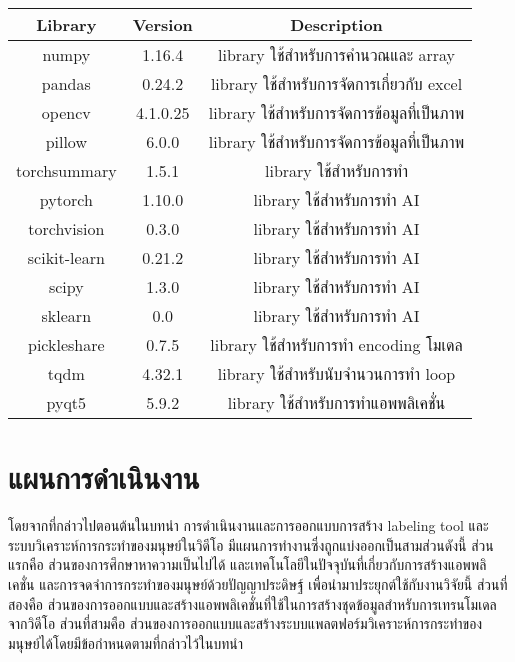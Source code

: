 \begin{tabular}{|c|c|c|}
		\hline
		{Library}&{Version}&{Description}\\
		\hline
		numpy	 			&  1.16.4		& library ใช้สำหรับการคำนวณและ array					\\
		pandas				& 0.24.2		& library ใช้สำหรับการจัดการเกี่ยวกับ excel				\\
		opencv			 	& 4.1.0.25		& library ใช้สำหรับการจัดการข้อมูลที่เป็นภาพ				\\
		pillow				& 6.0.0		& library ใช้สำหรับการจัดการข้อมูลที่เป็นภาพ				\\
		torchsummary			& 1.5.1		& library ใช้สำหรับการทำ 							\\
		pytorch		 		& 1.10.0		& library ใช้สำหรับการทำ AI							\\
		torchvision				& 0.3.0	 	& library ใช้สำหรับการทำ AI							\\
		scikit-learn				& 0.21.2		& library ใช้สำหรับการทำ AI							\\
		scipy					& 1.3.0		& library ใช้สำหรับการทำ AI							\\
		sklearn				& 0.0			& library ใช้สำหรับการทำ AI							\\
		pickleshare			& 0.7.5		& library ใช้สำหรับการทำ encoding โมเดล				\\
		tqdm					& 4.32.1		& library ใช้สำหรับนับจำนวนการทำ loop					\\
		pyqt5					& 5.9.2		& library ใช้สำหรับการทำแอพพลิเคชั่น					\\
		\hline
\end{tabular}



\vspace{3mm}
\section{แผนการดำเนินงาน}
โดยจากที่กล่าวไปตอนต้นในบทนำ
การดำเนินงานและการออกแบบการสร้าง labeling tool และระบบวิเคราะห์การกระทำของมนุษย์ในวิดีโอ มีแผนการทำงานซึ่งถูกแบ่งออกเป็นสามส่วนดังนี้ 
ส่วนแรกคือ ส่วนของการศึกษาหาความเป็นไปได้ และเทคโนโลยีในปัจจุบันที่เกี่ยวกับการสร้างแอพพลิเคชั่น และการจดจำการกระทำของมนุษย์ด้วยปัญญาประดิษฐ์ เพื่อนำมาประยุกต์ใช้กับงานวิจัยนี้
ส่วนที่สองคือ ส่วนของการออกแบบและสร้างแอพพลิเคชั่นที่ใช้ในการสร้างชุดข้อมูลสำหรับการเทรนโมเดลจากวิดีโอ
ส่วนที่สามคือ ส่วนของการออกแบบและสร้างระบบแพลตฟอร์มวิเคราะห์การกระทำของมนุษย์ได้โดยมีข้อกำหนดตามที่กล่าวไว้ในบทนำ

